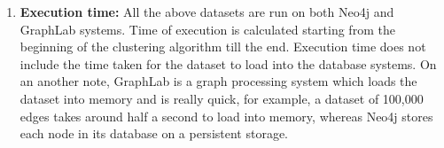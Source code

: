 \begin{enumerate}
	\item
	\textbf{Execution time:} All the above datasets are run on both Neo4j and GraphLab systems. Time of execution is calculated starting from the beginning of the clustering algorithm till the end. Execution time does not include the time taken for the dataset to load into the database systems. On an another note, GraphLab is a graph processing system which loads the dataset into memory and is really quick, for example, a dataset of 100,000 edges takes around half a second to load into memory, whereas Neo4j stores each node in its database on a persistent storage.
\end{enumerate}